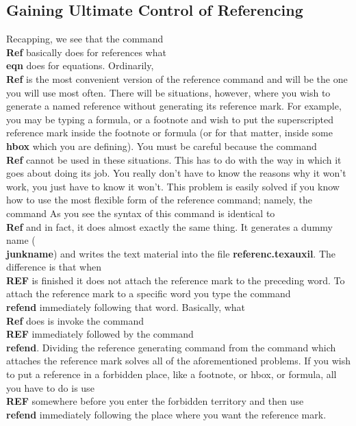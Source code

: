\subsection{Gaining Ultimate Control of Referencing}
 
Recapping, we see that
the command {\bf \\Ref} basically does for references what {\bf \\eqn}
does for equations.
Ordinarily, {\bf \\Ref} is the most convenient version of the
reference command and will be the one you will use most
often.
There will be situations, however, where you wish to generate a named
reference without generating its reference mark.
For example, you may be typing a formula, or a footnote and wish
to put the superscripted reference mark inside the footnote or formula
(or for that matter, inside some {\bf \\hbox} which you are
defining).
You must be careful because the command
{\bf \\Ref} cannot be used in these situations.
This has to do with the way in which it goes about doing its job.
You really don't have to know the reasons why it won't work,
you just have to know it won't.
This problem is easily solved if you know how to use the most
flexible form of the reference command; namely, the command
As you see the syntax of this command is identical to {\bf \\Ref}
and in fact, it does almost exactly the same thing.
It generates a dummy name ({\bf \\junkname}) and writes the text
material into the file {\bf referenc.texauxil}.
The difference is that when {\bf \\REF} is finished it does not
attach the reference mark to the preceding word.
To attach the reference mark to a specific word you type the command
{\bf \\refend} immediately following that word.
Basically, what {\bf \\Ref} does is invoke the command {\bf \\REF}
immediately followed by the command {\bf \\refend}.
Dividing the reference generating command from the
command which attaches the reference mark
solves all of the aforementioned problems.
If you wish to put a reference in a forbidden place, like a footnote,
or hbox, or formula, all you have to do is use {\bf \\REF}
somewhere before you enter the forbidden territory and then use
{\bf \\refend} immediately following the place where you want the
reference mark.
 
